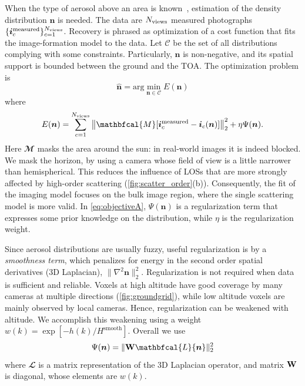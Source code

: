 \documentclass[10pt,letterpaper]{article}
\newcommand{\argmin}{\mathrm{arg}\min}
\newcommand{\vect}[1]{\bm{#1}}
\newcommand{\MaskSun}{\mathbfcal{M}}
\newcommand{\Laplacian}{\mathbfcal{L}}
\newcommand{\DistSet}{\mathcal{C}}
\newcommand{\DistUnknown}{\vect{n}}
\newcommand{\DistEstimated}{\hat{\vect{n}}}
\newcommand{\CostFunc}[1]{E(#1)}
\begin{document}
When the type of aerosol above an area is known~\cite{Martonchik2009},
estimation of the density distribution $\DistUnknown$ is needed. The
data are $N_{\rm views}$ measured photographs $\{ {\bm i}^{\rm
  measured}_c\}_{c=1}^{N_{\rm views}}$. Recovery is phrased as
optimization of a cost function that fits the image-formation model to
the data. Let $\DistSet$ be the set of all distributions complying
with some constraints.  Particularly, $\DistUnknown$ is non-negative,
and its spatial support is bounded between the ground and the TOA. The
optimization problem is
\begin{equation}
  \label{eq:minobjectiveA}
  \DistEstimated =
  \argmin_{\DistUnknown \in \DistSet} \CostFunc{\DistUnknown}
\end{equation}
where
\begin{equation}
  \label{eq:objectiveA}
  \CostFunc{\DistUnknown}
  = \sum_{c=1}^{N_{\rm views}}
  \left\|
    \MaskSun[{\bm i}^{\rm measured}_c - {\bm i}_c({\bm n})]
  \right\|^2_2  + \eta \Psi({\bm n}).
\end{equation}
Here $\MaskSun$ masks the area around the sun: in real-world images
it is indeed blocked. We mask the horizon, by using a camera whose field of view is a little narrower than hemispherical. This reduces the influence of LOSs that are more strongly affected by high-order scattering (\cref{fig:scatter_order}(b)). Consequently,
the fit of the imaging model focuses on the bulk image region, where the single scattering model is more valid.  In \cref{eq:objectiveA}, $\Psi({\bm n})$
is a regularization term that expresses some prior knowledge on the
distribution, while $\eta$ is the regularization weight.

Since aerosol distributions are usually fuzzy, useful regularization
is by a {\em smoothness term}, which penalizes for energy in the second order
spatial derivatives (3D Laplacian), $\| \nabla^2{\bm
  n}\|^2_2$. Regularization is not required when data is sufficient
and reliable.  Voxels at high
altitude have good coverage by many cameras at multiple directions (\cref{fig:groundgrid}),
while low altitude voxels are mainly observed by local
cameras. Hence, regularization can be weakened with altitude. We
accomplish this weakening using a weight
$w(k)=\exp\left[-h(k)/H^\mathrm{smooth}\right]$.  Overall we use
\begin{equation}
  \label{eq:regularizer}
  \Psi({\bm n}) = \| {\bf W} \Laplacian{\bm n}\|^2_2
\end{equation}
where $\Laplacian$ is a matrix representation of the 3D Laplacian
operator, and matrix ${\bf W}$ is diagonal, whose elements are $w(k)$.
\end{document}
